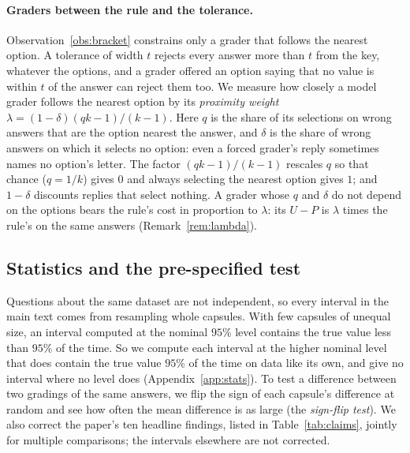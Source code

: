 \documentclass{article}
\begin{document}
\paragraph{Graders between the rule and the tolerance.} Observation~\ref{obs:bracket} constrains only a grader that
follows the nearest option. A tolerance of width $t$ rejects every answer more than $t$ from the key, whatever the
options, and a grader offered an option saying that no value is within $t$ of the answer can reject them too. We measure
how closely a model grader follows the nearest option by its \emph{proximity weight} $\lambda=(1-\delta)(qk-1)/(k-1)$. Here $q$ is the share of its selections on wrong answers that are the option
nearest the answer, and $\delta$ is the share of wrong answers on which it selects no option: even a forced grader's
reply sometimes names no option's letter. The factor $(qk-1)/(k-1)$ rescales $q$ so that chance ($q=1/k$) gives $0$
and always selecting the nearest option gives $1$; and $1-\delta$ discounts replies that select nothing. A
grader whose $q$ and $\delta$ do not depend on the options bears the rule's cost in proportion to $\lambda$: its
$U-P$ is $\lambda$ times the rule's on the same answers (Remark~\ref{rem:lambda}).

\subsection{Statistics and the pre-specified test}
\label{sec:stats}

Questions about the same dataset are not independent, so every interval in the main text comes from resampling whole
capsules. With few capsules of unequal size, an interval computed at the nominal $95\%$ level contains the true value
less than $95\%$ of the time. So we compute each interval at the higher nominal level that does contain the true
value $95\%$ of the time on data like its own, and give no interval where no level does (Appendix~\ref{app:stats}).
To test a difference between two gradings of the same answers, we flip the sign of each capsule's difference at random
and see how often the mean difference is as large (the \emph{sign-flip test}). We also correct the paper's ten
headline findings, listed in Table~\ref{tab:claims}, jointly for multiple comparisons; the intervals elsewhere are not
corrected.
\end{document}
